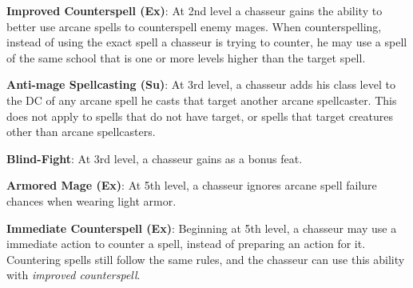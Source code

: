 {\textbf{Improved Counterspell (Ex)}: At 2nd level a chasseur gains the ability to better use arcane spells to counterspell enemy mages. When counterspelling, instead of using the exact spell a chasseur is trying to counter, he may use a spell of the same school that is one or more levels higher than the target spell.

\textbf{Anti-mage Spellcasting (Su)}: At 3rd level, a chasseur adds his class level to the DC of any arcane spell he casts that target another arcane spellcaster. This does not apply to spells that do not have target, or spells that target creatures other than arcane spellcasters.

\textbf{Blind-Fight}: At 3rd level, a chasseur gains  as a bonus feat.

\textbf{Armored Mage (Ex)}: At 5th level, a chasseur ignores arcane spell failure chances when wearing light armor.

\textbf{Immediate Counterspell (Ex)}: Beginning at 5th level, a chasseur may use a immediate action to counter a spell, instead of preparing an action for it. Countering spells still follow the same rules, and the chasseur can use this ability with \emph{improved counterspell}.
}
